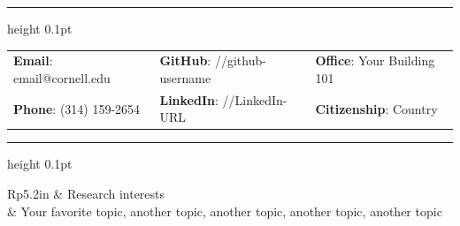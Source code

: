 \documentclass[letterpaper, 11pt]{article}
\newcommand{\headingfont}{\Large\color{OliveGreen}}
\newenvironment{SectionTable}[1]{
	\renewcommand*{\arraystretch}{1.4}
	\setlength{\tabcolsep}{10pt}
	\begin{longtable}{Rp{5.2in}} & #1 \\}
{\end{longtable}\vspace{-.3cm}}
\begin{document}
\hrule height 0.1pt %
\vspace{0.5cm} %




\vspace{0.5cm} 
\begin{center}
\begin{tabular}{lll}
\textbf{Email}: email@cornell.edu      &
\hspace{0.55in} \textbf{GitHub}: //github-username    &
\hspace{0.4in} 	\textbf{Office}: Your Building 101 \\

\textbf{Phone}: (314) 159-2654   & 
\hspace{0.55in} \textbf{LinkedIn}: //LinkedIn-URL   & 
\hspace{0.4in} \textbf{Citizenship}: Country 
\end{tabular}
\end{center}

\hrule height 0.1pt %


\begin{SectionTable}{\headingfont Research interests}
& Your favorite topic, another topic, another topic, another topic, another topic
\end{SectionTable}

\end{document}
